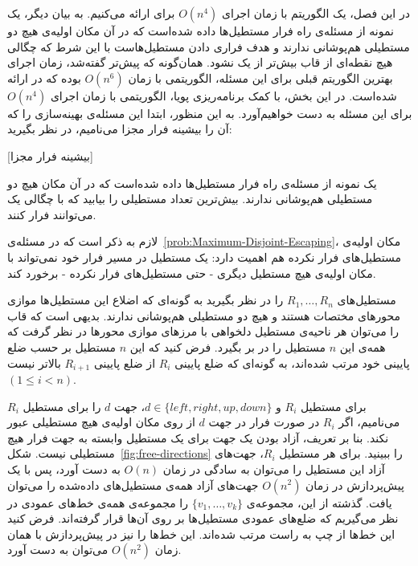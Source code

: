 

در این فصل، یک الگوریتم با زمان اجرای $O(n ^ 4)$ برای  ارائه می‌کنیم. به بیان دیگر، یک نمونه از مسئله‌ی راه فرار مستطیل‌ها داده شده‌است که در آن مکان اولیه‌ی هیچ دو مستطیلی هم‌پوشانی ندارند و هدف فراری دادن مستطیل‌هاست با این شرط که چگالی هیچ نقطه‌ای از قاب بیش‌تر از یک نشود. همان‌گونه که پیش‌تر گفته‌شد، زمان اجرای بهترین الگوریتم قبلی برای این مسئله، الگوریتمی با زمان $O(n ^ 6)$ بوده که در \cite{BoundaryRec} ارائه شده‌است. در این بخش، با کمک برنامه‌ریزی پویا، الگوریتمی با زمان اجرای $O(n ^ 4)$ برای این مسئله به دست خواهیم‌آورد. به این منظور، ابتدا این مسئله‌ی بهینه‌سازی را که آن را بیشینه فرار مجزا می‌نامیم، در نظر بگیرید:

[بیشینه فرار مجزا]
\label{prob:Maximum-Disjoint-Escaping}

یک نمونه از مسئله‌ی راه فرار مستطیل‌ها داده شده‌است که در آن مکان هیچ دو مستطیلی هم‌پوشانی ندارند. بیش‌ترین تعداد مستطیلی را بیابید که با چگالی یک می‌توانند فرار کنند.


لازم به ذکر است که در مسئله‌ی~\ref{prob:Maximum-Disjoint-Escaping}، مکان اولیه‌ی مستطیل‌های فرار نکرده هم اهمیت دارد: یک مستطیل در مسیر فرار خود نمی‌تواند با مکان اولیه‌ی هیچ مستطیل دیگری - حتی مستطیل‌های فرار نکرده - برخورد کند.

مستطیل‌های $R_1, \ldots, R_n$ را در نظر بگیرید به گونه‌ای که اضلاع این مستطیل‌ها موازی محور‌های مختصات هستند و هیچ دو مستطیلی هم‌پوشانی ندارند. بدیهی است که قاب را می‌توان هر ناحیه‌ی مستطیل دلخواهی با مرز‌های موازی محور‌ها در نظر گرفت که همه‌ی این $n$ مستطیل را در بر بگیرد. فرض کنید که این $n$ مستطیل بر حسب ضلع پایینی خود مرتب شده‌اند، به گونه‌ای که ضلع پایینی $R_i$ از ضلع پایینی $R_{i + 1}$ بالا‌تر نیست $(1 \leq i < n)$.

برای مستطیل $R_i$ و  $d \in \{left, right, up, down\}$، جهت $d$ را برای مستطیل $R_i$
 می‌نامیم، اگر $R_i$ در صورت فرار در جهت $d$ از روی مکان اولیه‌ی هیچ مستطیلی عبور نکند. بنا بر تعریف، آزاد بودن یک جهت برای یک مستطیل وابسته به جهت فرار هیچ مستطیلی نیست. شکل~\ref{fig:free-directions} را ببینید. برای هر مستطیل $R_i$، جهت‌های آزاد این مستطیل را می‌توان به سادگی در زمان $O(n)$ به دست آورد، پس با یک پیش‌پردازش در زمان $O(n ^ 2)$ جهت‌های آزاد همه‌ی مستطیل‌های داده‌شده را می‌توان یافت. گذشته از این، مجموعه‌ی $\{v_1, \ldots, v_k\}$ را مجموعه‌ی همه‌ی خط‌های عمودی در نظر می‌گیریم که ضلع‌های عمودی مستطیل‌ها بر روی آن‌ها قرار گرفته‌اند. فرض کنید این خط‌ها از چپ به راست مرتب شده‌اند. این خط‌ها را نیز در پیش‌پردازش با همان زمان $O(n ^ 2)$ می‌توان به دست آورد.

